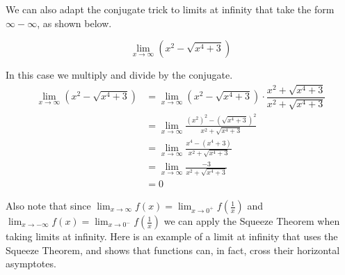 \documentclass{ximera}
\begin{document}
We can also adapt the conjugate trick to limits at infinity that take the form $\infty-\infty$, as shown below.

\begin{example}
$$\displaystyle\lim_{x\rightarrow \infty}\left(x^2-\sqrt{x^4+3}\right)$$

In this case we multiply and divide by the conjugate.
\begin{align*}
\displaystyle\lim_{x\rightarrow \infty}\left(x^2-\sqrt{x^4+3}\right)&=\lim_{x\rightarrow \infty}(x^2-\sqrt{x^4+3})\cdot\dfrac{x^2+\sqrt{x^4+3}}{x^2+\sqrt{x^4+3}}\\
&=\lim_{x\rightarrow \infty}\frac{(x^2)^2-(\sqrt{x^4+3})^2}{x^2+\sqrt{x^4+3}}\\
&=\lim_{x\rightarrow \infty}\frac{x^4-(x^4+3)}{x^2+\sqrt{x^4+3}}\\
&=\lim_{x\rightarrow \infty}\frac{-3}{x^2+\sqrt{x^4+3}}\\
&=0\end{align*}

\end{example}


Also note that since
\(
\lim_{x\to \infty} f(x) = \lim_{x\to 0^+} f\left(\frac{1}{x}\right)
\)
and
\(
\lim_{x\to -\infty} f(x) = \lim_{x\to 0^-} f\left(\frac{1}{x}\right)
\)
we can apply the Squeeze Theorem when taking limits at infinity.
Here is an example of a limit at infinity that uses the Squeeze
Theorem, and shows that functions can, in fact, cross their horizontal
asymptotes.
\end{document}
